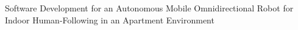 Software Development for an Autonomous Mobile Omnidirectional Robot for Indoor Human-Following in an Apartment Environment
